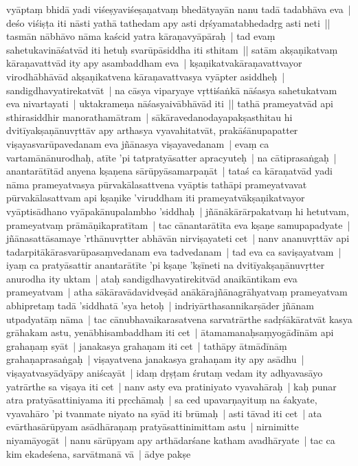 \documentclass[article,12pt,a4paper]{memoir}%
\begin{document}
	  
	  \pstart \leavevmode%
	vyāptaṃ bhidā yadi viśeṣyaviśeṣaṇatvaṃ bhedātyayān nanu tadā tadabhāva eva | deśo viśiṣṭa iti nāsti yathā tathedam apy asti dṛśyamatabhedadṛg asti neti ||  \label{thakur75-124.8} tasmān nābhāvo nāma kaścid yatra kāraṇavyāpāraḥ | tad evaṃ sahetukavināśatvād iti hetuḥ svarūpāsiddha iti sthitam || \label{thakur75-124.10} satām akṣaṇikatvaṃ kāraṇavattvād ity apy asambaddham eva | kṣaṇikatvakāraṇavattvayor virodhābhāvād akṣaṇikatvena kāraṇavattvasya vyāpter asiddheḥ | sandigdhavyatirekatvāt | na cāsya viparyaye vṛttiśaṅkā nāśasya sahetukatvam eva nivartayati | uktakrameṇa nāśasyaivābhāvād iti || \label{thakur75-124.14} tathā prameyatvād api sthirasiddhir manorathamātram | sākāravedanodayapakṣasthitau hi dvitīyakṣaṇānuvṛttāv apy arthasya vyavahitatvāt, prakāśānupapatter viṣayasvarūpavedanam eva jñānasya viṣayavedanam | evaṃ ca vartamānānurodhaḥ, atīte 'pi tatpratyāsatter apracyuteḥ | na cātiprasaṅgaḥ | anantarātītād anyena kṣaṇena sārūpyāsamarpaṇāt | tataś ca kāraṇatvād yadi nāma prameyatvasya pūrvakālasattvena vyāptis tathāpi prameyatvavat pūrvakālasattvam api kṣaṇike 'viruddham iti prameyatvākṣaṇikatvayor vyāptisādhano vyāpakānupalambho 'siddhaḥ | jñānākārārpakatvaṃ hi hetutvam, prameyatvaṃ prāmāṇikapratītam | tac cānantarātīta eva kṣaṇe samupapadyate | \label{thakur75-124.22} jñānasattāsamaye 'rthānuvṛtter abhāvān nirviṣayateti cet | \label{thakur75-124.22a} nanv ananuvṛttāv api tadarpitākārasvarūpasaṃvedanam eva tadvedanam | tad eva ca saviṣayatvam | iyaṃ ca pratyāsattir anantarātīte 'pi kṣaṇe 'kṣīneti na dvitīyakṣaṇānuvṛtter anurodha ity uktam | ataḥ sandigdhavyatirekitvād anaikāntikam eva prameyatvam | \label{thakur75-124.26} atha sākāravādavidveṣād anākārajñānagrāhyatvaṃ prameyatvam abhipretaṃ tadā 'siddhatā 'sya hetoḥ | \label{thakur75-124.27} indriyārthasannikarṣāder jñānam utpadyatāṃ nāma | \label{thakur75-124.27a} tac cānubhavaikarasatvena sarvatrārthe sadṛśākāratvāt kasya grāhakam astu, \label{thakur75-124.28} yenābhisambaddham iti cet | \label{thakur75-124.28a} ātamamanaḥsaṃyogādīnām api grahaṇaṃ syāt | \label{thakur75-124.29} janakasya grahaṇam iti cet | \label{thakur75-124.29a} tathāpy ātmādīnāṃ grahaṇaprasaṅgaḥ | viṣayatvena janakasya grahaṇam ity apy asādhu | viṣayatvasyādyāpy aniścayāt | \label{thakur75-124.30} idaṃ dṛṣṭam śrutaṃ vedam ity adhyavasāyo yatrārthe sa viṣaya iti cet | \label{thakur75-124.31} nanv asty eva pratiniyato vyavahāraḥ | kaḥ punar atra pratyāsattiniyama iti pṛcchāmaḥ | sa ced upavarṇayituṃ na śakyate, vyavahāro 'pi tvanmate niyato na syād iti brūmaḥ | \label{thakur75-124.33} asti tāvad iti cet | \label{thakur75-124.34} ata evārthasārūpyam asādhāraṇaṃ pratyāsattinimittam astu | nirnimitte niyamāyogāt | \label{thakur75-125.1} nanu sārūpyam apy arthādarśane katham avadhāryate | tac ca kim ekadeśena, sarvātmanā vā | ādye pakṣe 
\end{document}
